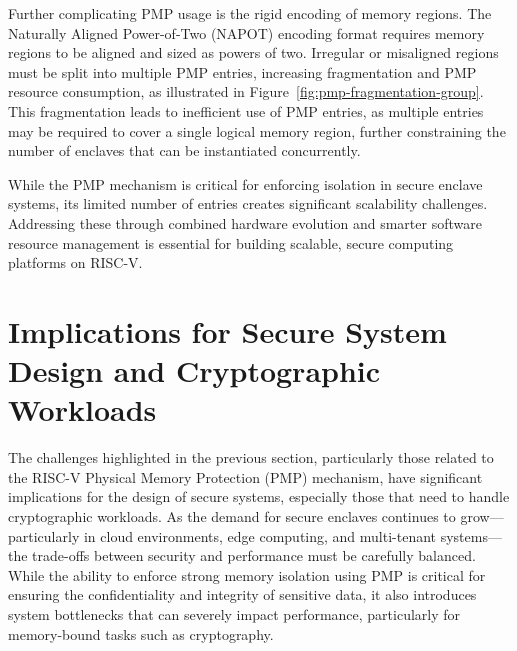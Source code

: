 Further complicating PMP usage is the rigid encoding of memory regions. The Naturally Aligned Power-of-Two (NAPOT) encoding format requires memory regions to be aligned and sized as powers of two. Irregular or misaligned regions must be split into multiple PMP entries, increasing fragmentation and PMP resource consumption, as illustrated in Figure~\ref{fig:pmp-fragmentation-group}. This fragmentation leads to inefficient use of PMP entries, as multiple entries may be required to cover a single logical memory region, further constraining the number of enclaves that can be instantiated concurrently.




While the PMP mechanism is critical for enforcing isolation in secure enclave systems, its limited number of entries creates significant scalability challenges. Addressing these through combined hardware evolution and smarter software resource management is essential for building scalable, secure computing platforms on RISC-V.

\section{Implications for Secure System Design and Cryptographic Workloads}
\label{sec:implications}
The challenges highlighted in the previous section, particularly those related to the RISC-V Physical Memory Protection (PMP) mechanism, have significant implications for the design of secure systems, especially those that need to handle cryptographic workloads. As the demand for secure enclaves continues to grow—particularly in cloud environments, edge computing, and multi-tenant systems—the trade-offs between security and performance must be carefully balanced. While the ability to enforce strong memory isolation using PMP is critical for ensuring the confidentiality and integrity of sensitive data, it also introduces system bottlenecks that can severely impact performance, particularly for memory-bound tasks such as cryptography.

